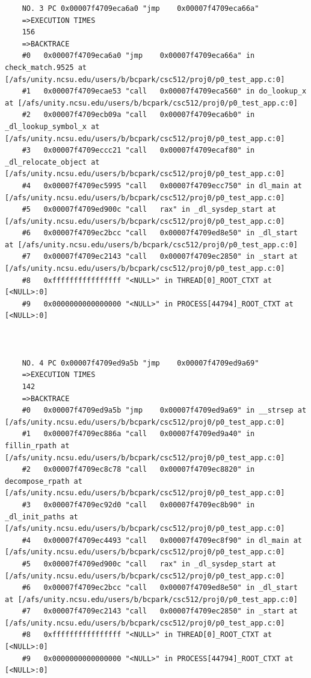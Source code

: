 \documentclass[11pt]{article}
\begin{document}
\begin{verbatim}
    NO. 3 PC 0x00007f4709eca6a0 "jmp    0x00007f4709eca66a"
    =>EXECUTION TIMES
    156
    =>BACKTRACE
    #0   0x00007f4709eca6a0 "jmp    0x00007f4709eca66a" in check_match.9525 at [/afs/unity.ncsu.edu/users/b/bcpark/csc512/proj0/p0_test_app.c:0]
    #1   0x00007f4709ecae53 "call   0x00007f4709eca560" in do_lookup_x at [/afs/unity.ncsu.edu/users/b/bcpark/csc512/proj0/p0_test_app.c:0]
    #2   0x00007f4709ecb09a "call   0x00007f4709eca6b0" in _dl_lookup_symbol_x at [/afs/unity.ncsu.edu/users/b/bcpark/csc512/proj0/p0_test_app.c:0]
    #3   0x00007f4709eccc21 "call   0x00007f4709ecaf80" in _dl_relocate_object at [/afs/unity.ncsu.edu/users/b/bcpark/csc512/proj0/p0_test_app.c:0]
    #4   0x00007f4709ec5995 "call   0x00007f4709ecc750" in dl_main at [/afs/unity.ncsu.edu/users/b/bcpark/csc512/proj0/p0_test_app.c:0]
    #5   0x00007f4709ed900c "call   rax" in _dl_sysdep_start at [/afs/unity.ncsu.edu/users/b/bcpark/csc512/proj0/p0_test_app.c:0]
    #6   0x00007f4709ec2bcc "call   0x00007f4709ed8e50" in _dl_start at [/afs/unity.ncsu.edu/users/b/bcpark/csc512/proj0/p0_test_app.c:0]
    #7   0x00007f4709ec2143 "call   0x00007f4709ec2850" in _start at [/afs/unity.ncsu.edu/users/b/bcpark/csc512/proj0/p0_test_app.c:0]
    #8   0xffffffffffffffff "<NULL>" in THREAD[0]_ROOT_CTXT at [<NULL>:0]
    #9   0x0000000000000000 "<NULL>" in PROCESS[44794]_ROOT_CTXT at [<NULL>:0]
    
    
    
    NO. 4 PC 0x00007f4709ed9a5b "jmp    0x00007f4709ed9a69"
    =>EXECUTION TIMES
    142
    =>BACKTRACE
    #0   0x00007f4709ed9a5b "jmp    0x00007f4709ed9a69" in __strsep at [/afs/unity.ncsu.edu/users/b/bcpark/csc512/proj0/p0_test_app.c:0]
    #1   0x00007f4709ec886a "call   0x00007f4709ed9a40" in fillin_rpath at [/afs/unity.ncsu.edu/users/b/bcpark/csc512/proj0/p0_test_app.c:0]
    #2   0x00007f4709ec8c78 "call   0x00007f4709ec8820" in decompose_rpath at [/afs/unity.ncsu.edu/users/b/bcpark/csc512/proj0/p0_test_app.c:0]
    #3   0x00007f4709ec92d0 "call   0x00007f4709ec8b90" in _dl_init_paths at [/afs/unity.ncsu.edu/users/b/bcpark/csc512/proj0/p0_test_app.c:0]
    #4   0x00007f4709ec4493 "call   0x00007f4709ec8f90" in dl_main at [/afs/unity.ncsu.edu/users/b/bcpark/csc512/proj0/p0_test_app.c:0]
    #5   0x00007f4709ed900c "call   rax" in _dl_sysdep_start at [/afs/unity.ncsu.edu/users/b/bcpark/csc512/proj0/p0_test_app.c:0]
    #6   0x00007f4709ec2bcc "call   0x00007f4709ed8e50" in _dl_start at [/afs/unity.ncsu.edu/users/b/bcpark/csc512/proj0/p0_test_app.c:0]
    #7   0x00007f4709ec2143 "call   0x00007f4709ec2850" in _start at [/afs/unity.ncsu.edu/users/b/bcpark/csc512/proj0/p0_test_app.c:0]
    #8   0xffffffffffffffff "<NULL>" in THREAD[0]_ROOT_CTXT at [<NULL>:0]
    #9   0x0000000000000000 "<NULL>" in PROCESS[44794]_ROOT_CTXT at [<NULL>:0]
    

\end{verbatim}
\end{document}

